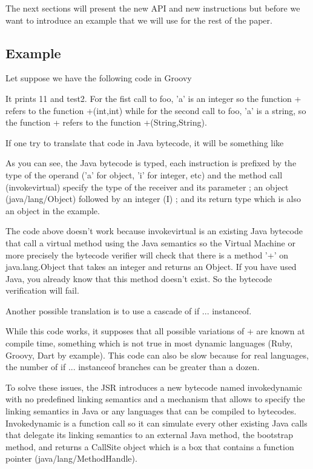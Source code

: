 \documentclass{sig-alternate}
\def \Jsr{JSR\xspace}
\begin{document}
    The next sections will present the new API and new instructions but before
    we want to introduce an example that we will use for the rest of the paper.

    \subsection{Example}
      Let suppose we have the following code in Groovy \cite{lang-groovy}

      

      It prints 11 and test2. For the fist call to foo, 'a' is an integer so the function + refers
      to the function +(int,int) while for the second call to foo, 'a' is a string, so the
      function + refers to the function +(String,String).

      If one try to translate that code in Java bytecode, it will be something like

      

      As you can see, the Java bytecode is typed, each instruction is prefixed 
      by the type of the operand ('a' for object, 'i' for integer, etc)
      and the method call (invokevirtual) specify the type of the receiver and its parameter ;
      an object (java/lang/Object) followed by an integer (I) ; and its return type
      which is also an object in the example.

      The code above doesn't work because invokevirtual is an existing Java bytecode that call
      a virtual method using the Java semantics so the Virtual Machine or more precisely
      the bytecode verifier will check that there is a method '+' on java.lang.Object
      that takes an integer and returns an Object. If you have used Java, you already know
      that this method doesn't exist. So the bytecode verification will fail.

      Another possible translation is to use a cascade of if ... instanceof.

      

      While this code works, it supposes that all possible variations of + are known at compile time,
      something which is not true in most dynamic languages (Ruby, Groovy, Dart by example).
      This code can also be slow because for real languages, the number of if ... instanceof branches
      can be greater than a dozen. 

      To solve these issues, the \Jsr introduces a new bytecode named invokedynamic with no predefined
      linking semantics and a mechanism that allows to specify the linking semantics in Java
      or any languages that can be compiled to bytecodes.
      Invokedynamic is a function call so it can simulate every other existing Java calls that delegate
      its linking semantics to an external Java method, the bootstrap method, and returns
      a CallSite object which is a box that contains a function pointer (java/lang/MethodHandle).
\end{document}
